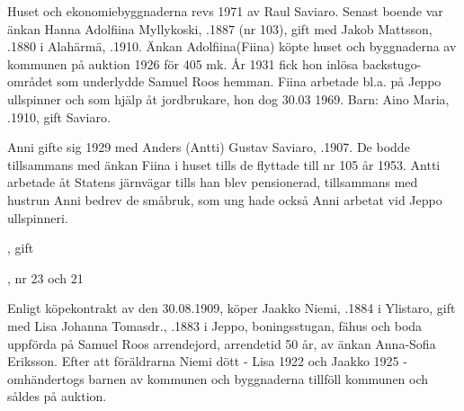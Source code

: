 
Huset och ekonomiebyggnaderna revs 1971 av Raul Saviaro. Senast boende var änkan Hanna Adolfiina Myllykoski, .1887 (nr 103), gift med Jakob Mattsson, .1880 i Alahärmä, .1910. Änkan Adolfiina(Fiina) köpte huset och byggnaderna av kommunen på auktion 1926 för 405 mk. År 1931 fick hon inlösa backstugo-området som underlydde Samuel Roos hemman. Fiina arbetade bl.a. på Jeppo ullspinner och som hjälp åt jordbrukare, hon dog 30.03 1969.  Barn:  Aino Maria, .1910, gift Saviaro.


Anni gifte sig 1929 med Anders (Antti) Gustav Saviaro, .1907. De bodde tillsammans med änkan Fiina i huset tills de flyttade till nr 105 år 1953. Antti arbetade åt Statens järnvägar tills han blev pensionerad, tillsammans med hustrun Anni bedrev de småbruk, som ung hade också Anni  arbetat vid Jeppo ullspinneri.
\begin{jhchildren}
  \item {}, gift
  \item {}, nr 23 och 21
\end{jhchildren}


Enligt köpekontrakt av den 30.08.1909, köper Jaakko Niemi, .1884 i Ylistaro, gift med Lisa Johanna Tomasdr., .1883 i Jeppo, boningsstugan, fähus och boda uppförda på Samuel Roos arrendejord, arrendetid 50 år, av änkan Anna-Sofia Eriksson. Efter att föräldrarna Niemi dött - Lisa 1922 och Jaakko 1925 - omhändertogs barnen av kommunen och byggnaderna tillföll kommunen och såldes på auktion.
\begin{jhchildren}
  \item {}
  \item {}
  \item {}
  \item {}
  \item {}
\end{jhchildren}


